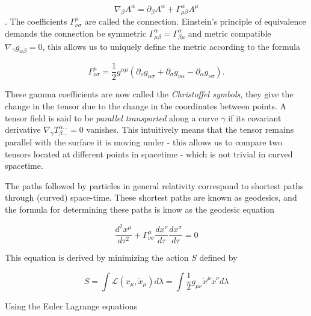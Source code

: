 \begin{equation}
    \nabla_\beta A^\alpha = \partial_\beta A^\alpha + \Gamma^{\alpha}_{\mu \beta} A^\mu
\end{equation}.
The coefficients $\Gamma^{\mu}_{\nu \sigma}$ are called the connection.  Einstein's principle of equivalence  demands the  connection be symmetric $\Gamma^{\alpha}_{\mu \beta} = \Gamma^{\alpha}_{\beta \mu}$ and metric compatible $\nabla_{\gamma} g_{\alpha \beta} = 0$, this allows us to uniquely define the metric according to the formula

\begin{equation}
    \Gamma^{\mu}_{\nu \sigma} = \frac{1}{2} g^{\alpha \mu} (\partial_{\nu}g_{\alpha \sigma}+\partial_{\sigma} g_{\nu \alpha} - \partial_{\alpha} g_{\nu \sigma}).
\label{eq:Christoffel symbol}
\end{equation}

These gamma coefficients are now called the \textit{Christoffel symbols}, they give the change in the tensor due to the change in the coordinates between points. A tensor field is said to be \textit{parallel transported}  along a curve $\gamma$ if its covariant derivative $\nabla_{\gamma} T^{\alpha ...}_{\beta ...} = 0$ vanishes. This intuitively means that the tensor remains parallel with the surface it is moving under - this allows us to compare two tensors located at different points in spacetime - which is not trivial in curved spacetime.

The paths followed by particles in general relativity correspond to shortest paths through (curved) space-time. These shortest paths are known as geodesics, and the formula for determining these paths is know as the geodesic equation

\begin{equation}
    \frac{d^2x^{\mu}}{d\tau^2} + \Gamma^{\mu}_{\nu \sigma} \frac{dx^{\nu}}{d\tau} \frac{dx^{\sigma}}{d\tau} = 0
\label{eq:Geodesic equation}
\end{equation}

This equation is derived by minimizing the action $S$ defined by

\newcommand{\Lagr}{\mathcal{L}}

\begin{equation}
    S = \int \mathcal{L}(x_\mu,\dot{x}_\mu) d\lambda = \int \frac{1}{2} g_{\mu \nu} \dot{x}^\mu \dot{x}^\nu d\lambda 
\label{eq:Invariant distance action}
\end{equation}

Using the Euler Lagrange equations

